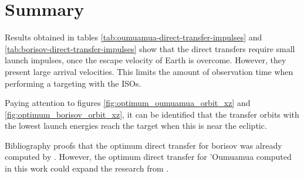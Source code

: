 \section{Summary}
\label{sec:direct-results}

Results obtained in tables \ref{tab:oumuamua-direct-transfer-impulses} and
\ref{tab:borisov-direct-transfer-impulses} show that the direct transfers
require small launch impulses, once the escape velocity of Earth is overcome.
However, they present large arrival velocities. This limits the amount of
observation time when performing a targeting with the ISOs.

Paying attention to figures \ref{fig:optimum_oumuamua_orbit_xz} and
\ref{fig:optimum_borisov_orbit_xz}, it can be identified that the transfer
orbits with the lowest launch energies reach the target when this is near the
ecliptic.

Bibliography proofs that the optimum direct transfer for borisov was already
computed by \cite{hibberd2021}. However, the optimum direct transfer for
'Oumuamua computed in this work could expand the research from \cite{hein2018}.

% 
% 
